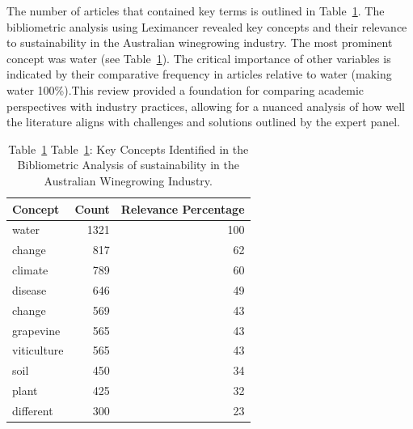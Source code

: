 \documentclass[fleqn,10pt]{wlscirep}
\begin{document}
The number of articles that contained key terms is outlined in Table~\ref{tab:lexi}. The bibliometric analysis using Leximancer revealed key concepts and their relevance to sustainability in the Australian winegrowing industry. The most prominent concept was water (see Table~\ref{tab:lexi}). The critical importance of other variables is indicated by their comparative frequency in articles relative to water (making water 100\%).This review provided a foundation for comparing academic perspectives with industry practices, allowing for a nuanced analysis of how well the literature aligns with challenges and solutions outlined by the expert panel.
\begin{table}[ht]
    \begin{tabular}{@{}lrr@{}}
    \toprule
    
    \textbf{Concept} & \textbf{Count} & \textbf{Relevance Percentage} \\
    \midrule
    water & 1321 & 100 \\
    change & 817 & 62 \\
    climate & 789 & 60 \\
    disease & 646 & 49 \\
    change & 569 & 43 \\
    grapevine & 565 & 43 \\
    viticulture & 565 & 43 \\
    soil & 450 & 34 \\
    plant & 425 & 32 \\
    different & 300 & 23 \\ \bottomrule
    \end{tabular}
    \caption{Table~\ref{tab:lexi} Table~\ref{tab:lexi}: Key Concepts Identified in the Bibliometric Analysis of sustainability in the Australian Winegrowing Industry.}\label{tab:lexi}
\end{table}
% 
\end{document}
